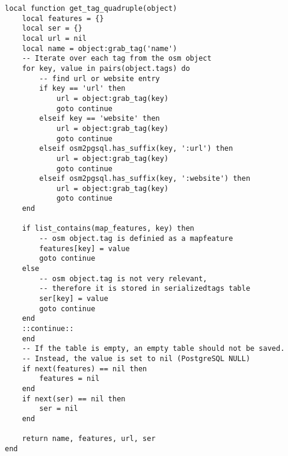 \newpage\begin{lstlisting}[language={[5.0]Lua}, caption={Hilfsfunktion zur osm object.tag Verarbeitung},label={lst:get-quadruple}]
local function get_tag_quadruple(object)
	local features = {}
	local ser = {}
	local url = nil
	local name = object:grab_tag('name')
	-- Iterate over each tag from the osm object
	for key, value in pairs(object.tags) do
		-- find url or website entry
		if key == 'url' then
			url = object:grab_tag(key)
			goto continue
		elseif key == 'website' then
			url = object:grab_tag(key)
			goto continue
		elseif osm2pgsql.has_suffix(key, ':url') then
			url = object:grab_tag(key)
			goto continue
		elseif osm2pgsql.has_suffix(key, ':website') then
			url = object:grab_tag(key)
			goto continue
	end
	
	if list_contains(map_features, key) then
		-- osm object.tag is definied as a mapfeature
		features[key] = value
		goto continue
	else
		-- osm object.tag is not very relevant,
		-- therefore it is stored in serializedtags table
		ser[key] = value
		goto continue
	end
	::continue::
	end
	-- If the table is empty, an empty table should not be saved.
	-- Instead, the value is set to nil (PostgreSQL NULL)
	if next(features) == nil then
		features = nil
	end
	if next(ser) == nil then
		ser = nil
	end
	
	return name, features, url, ser
end
\end{lstlisting}

\newpage
